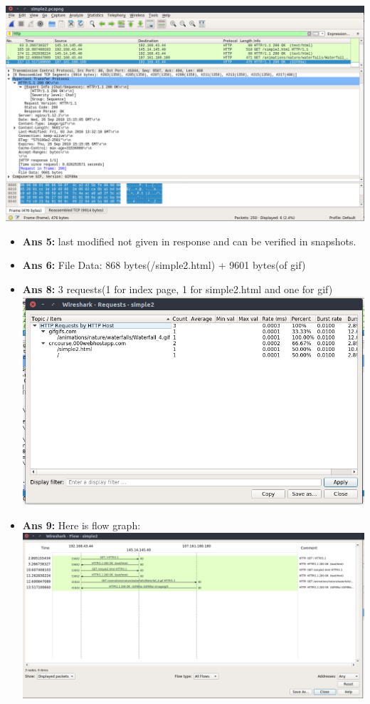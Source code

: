 \documentclass[14pt]{extarticle}
\begin{document}
    \includegraphics[scale=0.40]{1_10_4}\\[10pt]
    \begin{itemize}
        \item \textbf{Ans 5:} last modified not given in response and can be verified in snapshots.
        \item \textbf{Ans 6:} File Data: 868 bytes(/simple2.html) + 9601 bytes(of gif)
        \item \textbf{Ans 8:} 3 requests(1 for index page, 1 for simple2.html and one for gif)\\[10pt]
        \includegraphics[scale=0.40]{1_10_5}\\[10pt]
        \item \textbf{Ans 9:} Here is flow graph:\\[10pt]
        \includegraphics[scale=0.36]{1_10_6}\\[10pt]
    \end{itemize}
    \vspace{1cm}
\end{document}
